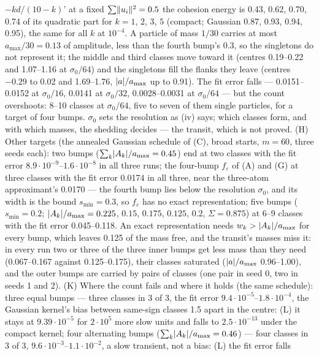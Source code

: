 \begin{sloppypar}
$-kd/(10 - k)$' at a fixed $\sum\lVert u_i\rVert^2 = 0.5$ the cohesion energy is 0.43, 0.62, 0.70, 0.74 of its quadratic
part for $k = 1$, $2$, $3$, $5$ (compact; Gaussian 0.87, 0.93, 0.94, 0.95), the same for all $k$ at $10^{-4}$. A
particle of mass $1/30$ carries at most $a_{\max}/30 = 0.13$ of amplitude, less than the fourth bump's 0.3, so the
singletons do not represent it; the middle and third classes move toward it (centres 0.19--0.22 and 1.07--1.16 at
$\sigma_0/64$) and the singletons fill the flanks they leave (centres $-0.29$ to 0.02 and 1.69--1.76,
$\lvert a\rvert/a_{\max}$ up to 0.91). The fit error falls --- 0.0151--0.0152 at $\sigma_0/16$, 0.0141 at $\sigma_0/32$,
0.0028--0.0031 at $\sigma_0/64$ --- but the count overshoots: 8--10 classes at $\sigma_0/64$, five to seven of them
single particles, for a target of four bumps. $\sigma_0$ sets the resolution as (iv) says; which classes form, and
with which masses, the shedding decides --- the transit, which is not proved. (H) Other targets (the annealed Gaussian
schedule of (C), broad starts, $m = 60$, three seeds each): two bumps ($\sum_k\lvert A_k\rvert/a_{\max} = 0.45$) end at two
classes with the fit error $8.9\cdot10^{-9}$--$1.6\cdot10^{-8}$ in all three runs; the four-bump $f_\varepsilon$ of
(A) and (G) at three classes with the fit error 0.0174 in all three, near the three-atom approximant's 0.0170 --- the
fourth bump lies below the resolution $\sigma_0$, and its width is the bound $s_{\min} = 0.3$, so $f_\varepsilon$ has
no exact representation; five bumps ($s_{\min} = 0.2$; $\lvert A_k\rvert/a_{\max} = 0.225$, $0.15$, $0.175$, $0.125$, $0.2$,
$\Sigma = 0.875$) at 6--9 classes with the fit error 0.045--0.118. An exact representation needs
$w_k > \lvert A_k\rvert/a_{\max}$ for every bump, which leaves 0.125 of the mass free, and the transit's masses miss it: in
every run two or three of the three inner bumps get less mass than they need (0.067--0.167 against 0.125--0.175),
their classes saturated ($\lvert a\rvert/a_{\max}$ 0.96--1.00), and the outer bumps are carried by pairs of classes (one pair
in seed 0, two in seeds 1 and 2). (K) Where the count fails and where it holds (the same schedule): three equal bumps
--- three classes in 3 of 3, the fit error $9.4\cdot10^{-5}$--$1.8\cdot10^{-4}$, the Gaussian kernel's bias between
same-sign classes 1.5 apart in the centre: (L) it stays at $9.39\cdot10^{-5}$ for $2\cdot10^5$ more slow units and
falls to $2.5\cdot10^{-13}$ under the compact kernel; four alternating bumps ($\sum_k\lvert A_k\rvert/a_{\max} = 0.46$) ---
four classes in 3 of 3, $9.6\cdot10^{-3}$--$1.1\cdot10^{-2}$, a slow transient, not a bias: (L) the fit error falls

\end{sloppypar}
